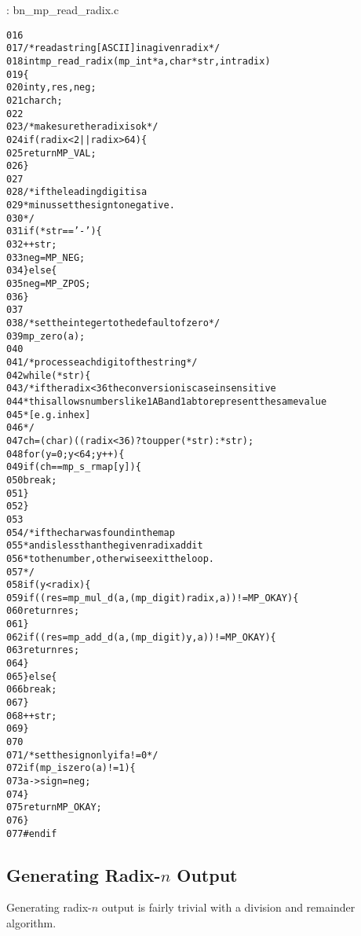 \documentclass[b5paper]{book}
\begin{document}
\vspace{+3mm}\begin{small}
\hspace{-5.1mm}{\bf File}: bn\_mp\_read\_radix.c
\vspace{-3mm}
\begin{alltt}
016   
017   /* read a string [ASCII] in a given radix */
018   int mp_read_radix (mp_int * a, char *str, int radix)
019   \{
020     int     y, res, neg;
021     char    ch;
022   
023     /* make sure the radix is ok */
024     if (radix < 2 || radix > 64) \{
025       return MP_VAL;
026     \}
027   
028     /* if the leading digit is a 
029      * minus set the sign to negative. 
030      */
031     if (*str == '-') \{
032       ++str;
033       neg = MP_NEG;
034     \} else \{
035       neg = MP_ZPOS;
036     \}
037   
038     /* set the integer to the default of zero */
039     mp_zero (a);
040     
041     /* process each digit of the string */
042     while (*str) \{
043       /* if the radix < 36 the conversion is case insensitive
044        * this allows numbers like 1AB and 1ab to represent the same  value
045        * [e.g. in hex]
046        */
047       ch = (char) ((radix < 36) ? toupper (*str) : *str);
048       for (y = 0; y < 64; y++) \{
049         if (ch == mp_s_rmap[y]) \{
050            break;
051         \}
052       \}
053   
054       /* if the char was found in the map 
055        * and is less than the given radix add it
056        * to the number, otherwise exit the loop. 
057        */
058       if (y < radix) \{
059         if ((res = mp_mul_d (a, (mp_digit) radix, a)) != MP_OKAY) \{
060            return res;
061         \}
062         if ((res = mp_add_d (a, (mp_digit) y, a)) != MP_OKAY) \{
063            return res;
064         \}
065       \} else \{
066         break;
067       \}
068       ++str;
069     \}
070     
071     /* set the sign only if a != 0 */
072     if (mp_iszero(a) != 1) \{
073        a->sign = neg;
074     \}
075     return MP_OKAY;
076   \}
077   #endif
\end{alltt}
\end{small}

\subsection{Generating Radix-$n$ Output}
Generating radix-$n$ output is fairly trivial with a division and remainder algorithm.  
\end{document}
